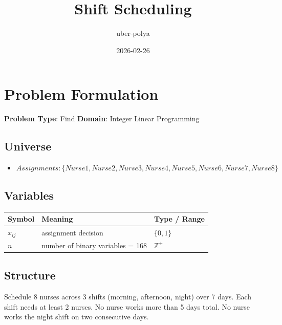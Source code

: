 \documentclass[11pt, a4paper]{article}
\title{Shift Scheduling}
\author{uber-polya}
\date{2026-02-26}
\begin{document}
\maketitle
\tableofcontents
\newpage

\section{Problem Formulation}

\begin{polyamodel}

\textbf{Problem Type}: Find \hfill
\textbf{Domain}: Integer Linear Programming


\end{polyamodel}

\subsection{Universe}

\begin{itemize}
  \item $Assignments: \{Nurse1, Nurse2, Nurse3, Nurse4, Nurse5, Nurse6, Nurse7, Nurse8\}$
\end{itemize}

\subsection{Variables}

\begin{longtable}{lll}
\toprule
\textbf{Symbol} & \textbf{Meaning} & \textbf{Type / Range} \\
\midrule
\endhead
$x_{ij}$ & assignment decision & $\{0, 1\}$ \\
$n$ & number of binary variables = 168 & $\mathbb{{Z}}^+$ \\
\bottomrule
\end{longtable}

\subsection{Structure}

Schedule 8 nurses across 3 shifts (morning, afternoon, night) over 7 days.
Each shift needs at least 2 nurses. No nurse works more than 5 days total.
No nurse works the night shift on two consecutive days.
\end{document}
